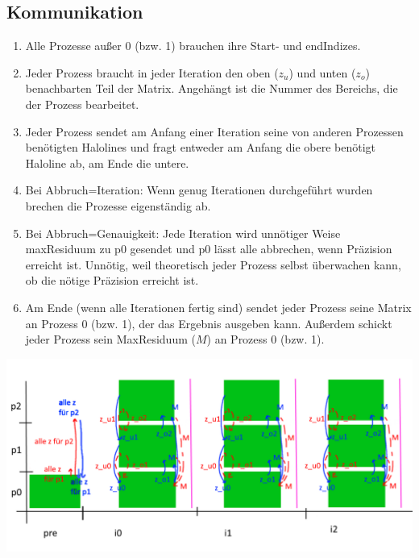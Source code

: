 \documentclass[a4paper,10pt]{article}
\begin{document}
\subsection*{Kommunikation}
\begin{enumerate}
 \item Alle Prozesse außer 0 (bzw. 1) brauchen ihre Start- und endIndizes.
 \item Jeder Prozess braucht in jeder Iteration den oben ($z_{u}$) und unten ($z_o$) benachbarten Teil der Matrix. Angehängt ist die Nummer des Bereichs, die der Prozess bearbeitet.
 \item Jeder Prozess sendet am Anfang einer Iteration seine von anderen Prozessen benötigten Halolines und fragt entweder am Anfang die obere benötigt Haloline ab, am Ende die untere.
 \item Bei Abbruch=Iteration: Wenn genug Iterationen durchgeführt wurden brechen die Prozesse eigenständig ab. 
 \item Bei Abbruch=Genauigkeit: Jede Iteration wird unnötiger Weise maxResiduum zu p0 gesendet und p0 lässt alle abbrechen, wenn Präzision erreicht ist. Unnötig, weil theoretisch jeder Prozess selbst überwachen kann, ob die nötige Präzision erreicht ist.
 \item Am Ende (wenn alle Iterationen fertig sind) sendet jeder Prozess seine Matrix an Prozess 0 (bzw. 1), der das Ergebnis ausgeben kann. Außerdem schickt jeder Prozess sein MaxResiduum ($M$) an Prozess 0 (bzw. 1).
\end{enumerate}
\includegraphics[width=14cm]{Comms.png}
\end{document}
